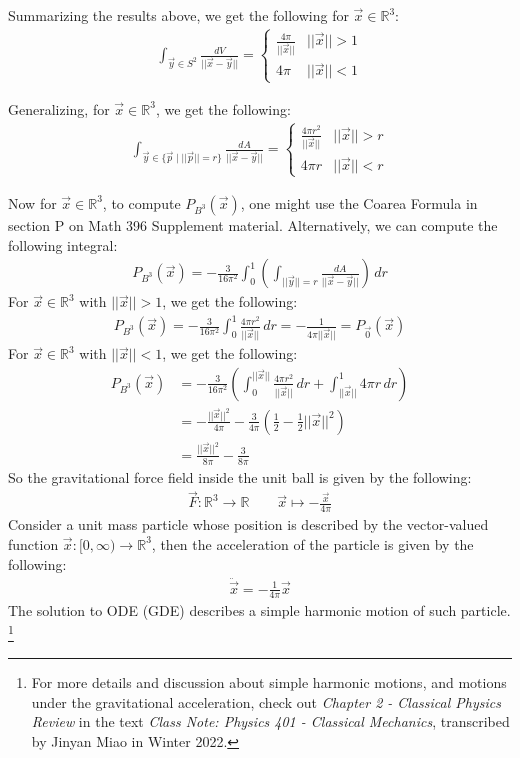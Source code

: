 \documentclass[15pt]{book}
\theoremstyle{break}
\theoremstyle{break}
\newcommand{\R}{\mathbb{R}}
\begin{document}
Summarizing the results above, we get the following for $\vec{x}\in \R^3$:
\begin{align*}
\int_{\vec{y}\in S^2}\frac{dV}{||\vec{x}-\vec{y}||} = \begin{cases} \frac{4\pi}{||\vec{x}||} & ||\vec{x}|| >1\\
4\pi & ||\vec{x}|| <1 
\end{cases}
\end{align*}

Generalizing, for $\vec{x}\in \R^3$, we get the following:
\begin{align*}
\int_{\vec{y}\in \{\vec{p}\mid ||\vec{p}||=r\} }\frac{dA}{||\vec{x}-\vec{y}||} = \begin{cases} \frac{4\pi r^2}{||\vec{x}||} & ||\vec{x}|| >r\\
4\pi r & ||\vec{x}|| <r 
\end{cases}
\end{align*}

\hfill\break
Now for $\vec{x}\in \R^3$, to compute $P_{B^3}(\vec{x})$, one might use the Coarea Formula in section P on Math 396 Supplement material. Alternatively, we can compute the following integral:
\begin{align*}
P_{B^3}(\vec{x}) = -\frac{3}{16\pi^2}\int_0^1\left( \int_{||\vec{y}|| = r}\frac{dA}{||\vec{x}-\vec{y}||}\right)\, dr
\end{align*}
For $\vec{x}\in \R^3$ with $||\vec{x}||>1$, we get the following:
\begin{align*}
P_{B^3}(\vec{x})  = -\frac{3}{16\pi ^2}\int_0^1 \frac{4\pi r^2}{||\vec{x}||}\, dr = -\frac{1}{4\pi ||\vec{x}||} = P_{\vec{0}}(\vec{x})
\end{align*}
For $\vec{x}\in \R^3$ with $||\vec{x}|| <1$, we get the following:
\begin{align*}
P_{B^3}(\vec{x})  
&= -\frac{3}{16\pi^2}\left(\int_{0}^{||\vec{x}||}\frac{4\pi r^2}{||\vec{x}||}\, dr + \int_{||\vec{x}||}^1 4\pi r\, dr\right) \\
&= -\frac{||\vec{x}||^2}{4\pi}-\frac{3}{4\pi}\left(\frac{1}{2}-\frac{1}{2}||\vec{x}||^2\right) \\
&= \frac{||\vec{x}||^2}{8\pi} -\frac{3}{8\pi}
\end{align*}
So the gravitational force field inside the unit ball is given by the following:
\begin{align*}
\vec{F}: \R^3 \to \R \qquad \vec{x}\mapsto -\frac{\vec{x}}{4\pi}
\end{align*}
Consider a unit mass particle whose position is described by the vector-valued function $\vec{x}:[0,\infty) \to \R^3$, then the acceleration of the particle is given by the following:
\begin{align*}
\ddot{\vec{x}} = -\frac{1}{4\pi}\vec{x} \tag{GDE}
\end{align*}
The solution to ODE (GDE) describes a simple harmonic motion of such particle. \footnote{For more details and discussion about simple harmonic motions, and motions under the gravitational acceleration, check out \textit{Chapter 2 -  Classical Physics Review} in the text \textit{Class Note: Physics 401 - Classical Mechanics}, transcribed by Jinyan Miao in Winter 2022.}
\end{document}
